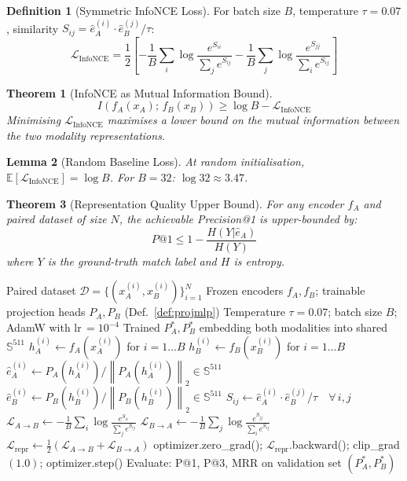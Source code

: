 \documentclass[12pt,a4paper]{article}
\theoremstyle{definition}
\newtheorem{definition}{Definition}[section]
\theoremstyle{plain}
\newtheorem{theorem}{Theorem}[section]
\newtheorem{lemma}[theorem]{Lemma}
\theoremstyle{remark}
\newcommand{\Sph}{\mathbb{S}}
\newcommand{\Norm}[1]{\left\|#1\right\|}
\newcommand{\EE}{\mathbb{E}}
\begin{document}
\begin{definition}[Symmetric InfoNCE Loss]
For batch size $B$, temperature $\tau = 0.07$, similarity $S_{ij} = \hat{e}_A^{(i)} \cdot \hat{e}_B^{(j)} / \tau$:
\[
  \mathcal{L}_{\text{InfoNCE}} = \frac{1}{2}\left[
    -\frac{1}{B}\sum_i \log\frac{e^{S_{ii}}}{\sum_j e^{S_{ij}}}
    -\frac{1}{B}\sum_j \log\frac{e^{S_{jj}}}{\sum_i e^{S_{ij}}}
  \right]
\]
\end{definition}

\begin{theorem}[InfoNCE as Mutual Information Bound]
\[
  I(f_A(x_A);\, f_B(x_B)) \ge \log B - \mathcal{L}_{\text{InfoNCE}}
\]
Minimising $\mathcal{L}_{\text{InfoNCE}}$ maximises a lower bound on the mutual information between the two modality representations.
\end{theorem}

\begin{lemma}[Random Baseline Loss]
At random initialisation, $\EE[\mathcal{L}_{\text{InfoNCE}}] = \log B$. For $B = 32$: $\log 32 \approx 3.47$.
\end{lemma}

\begin{theorem}[Representation Quality Upper Bound]
For any encoder $f_A$ and paired dataset of size $N$, the achievable Precision@1 is upper-bounded by:
\[
  P@1 \le 1 - \frac{H(Y|\hat{e}_A)}{H(Y)}
\]
where $Y$ is the ground-truth match label and $H$ is entropy.
\end{theorem}

\begin{algorithm}[H]
\caption{Challenge 1 — Multimodal Representation Learning (Coordinated Embedding)}
\label{alg:repr_challenge}
\begin{algorithmic}[1]
\Require Paired dataset $\mathcal{D} = \{(x_A^{(i)}, x_B^{(i)})\}_{i=1}^N$
\Require Frozen encoders $f_A, f_B$; trainable projection heads $P_A, P_B$ (Def.~\ref{def:projmlp})
\Require Temperature $\tau = 0.07$; batch size $B$; AdamW with lr\,$= 10^{-4}$
\Ensure Trained $P_A^*, P_B^*$ embedding both modalities into shared $\Sph^{511}$
    \State $h_A^{(i)} \gets f_A(x_A^{(i)})$ for $i=1\ldots B$ 
    \State $h_B^{(i)} \gets f_B(x_B^{(i)})$ for $i=1\ldots B$
    \State $\hat{e}_A^{(i)} \gets P_A(h_A^{(i)}) / \Norm{P_A(h_A^{(i)})}_2 \in \Sph^{511}$
    \State $\hat{e}_B^{(i)} \gets P_B(h_B^{(i)}) / \Norm{P_B(h_B^{(i)})}_2 \in \Sph^{511}$
    \State $S_{ij} \gets \hat{e}_A^{(i)} \cdot \hat{e}_B^{(j)} / \tau \quad \forall\, i,j$ 
    \State $\mathcal{L}_{A \to B} \gets -\frac{1}{B}\sum_i \log\frac{e^{S_{ii}}}{\sum_j e^{S_{ij}}}$
    \State $\mathcal{L}_{B \to A} \gets -\frac{1}{B}\sum_j \log\frac{e^{S_{jj}}}{\sum_i e^{S_{ij}}}$
    \State $\mathcal{L}_{\text{repr}} \gets \frac{1}{2}(\mathcal{L}_{A \to B} + \mathcal{L}_{B \to A})$
    \State optimizer.zero\_grad(); $\mathcal{L}_{\text{repr}}$.backward(); clip\_grad$(1.0)$; optimizer.step()
  \EndFor
  \State Evaluate: P@1, P@3, MRR on validation set
\EndFor
\State \Return $(P_A^*, P_B^*)$
\end{algorithmic}
\end{algorithm}
\end{document}
